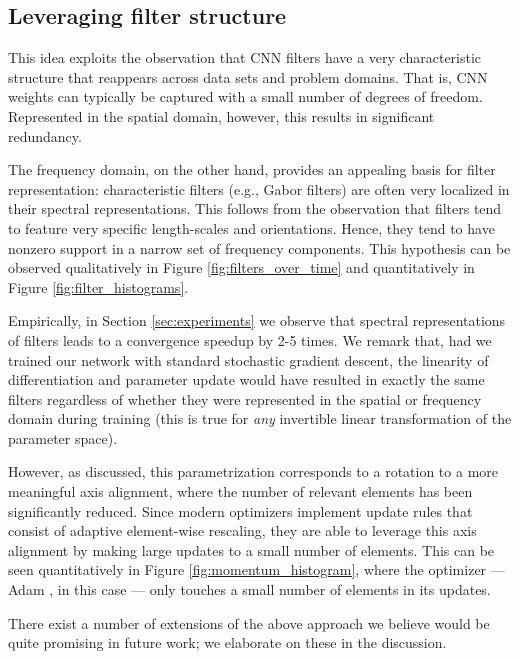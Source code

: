 \documentclass{article} \usepackage{nips15submit_e,times}
\begin{document}
\subsection{Leveraging filter structure}
This idea exploits the observation that CNN filters have a very characteristic structure that reappears across data sets and problem domains.  That is, CNN weights can typically be captured with a small number of degrees of freedom. Represented in the spatial domain, however, this results in significant redundancy. 

The frequency domain, on the other hand, provides an appealing basis for filter representation: characteristic filters (e.g., Gabor filters) are often very localized in their spectral representations. This follows from the observation that filters tend to feature very specific length-scales and orientations. Hence, they tend to have nonzero support in a narrow set of frequency components. This hypothesis can be observed qualitatively in Figure \ref{fig:filters_over_time} and quantitatively in Figure \ref{fig:filter_histograms}.

Empirically, in Section \ref{sec:experiments} we observe that spectral representations of filters leads to a convergence speedup by 2-5 times. We remark that, had we trained our network with standard stochastic gradient descent, the linearity of differentiation and parameter update would have resulted in exactly the same filters regardless of whether they were represented in the spatial or frequency domain during training (this is true for \emph{any} invertible linear transformation of the parameter space).

However, as discussed, this parametrization corresponds to a rotation to a more meaningful axis alignment, where the number of relevant elements has been significantly reduced. Since modern optimizers implement update rules that consist of adaptive element-wise rescaling, they are able to leverage this axis alignment by making large updates to a small number of elements. This can be seen quantitatively in Figure \ref{fig:momentum_histogram}, where the optimizer --- Adam \citep{adam2015}, in this case --- only touches a small number of elements in its updates.

There exist a number of extensions of the above approach we believe would be quite promising in future work; we elaborate on these in the discussion.
\end{document}
